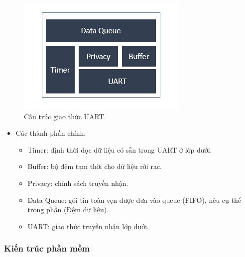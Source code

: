 \documentclass[a4paper,12pt,oneside]{article}
\begin{document}
\begin{itemize}
\begin{itemize}
			\begin{figure}[H]
				\centering
				\includegraphics[scale=1]{hinh/uart_protocol.PNG}
				\caption{Cấu trúc giao thức UART.}
			\end{figure}
			
		  \begin{itemize}
		  \item	Các thành phần chính:
		  	\begin{itemize}
		  		\item	Timer: định thời đọc dữ liệu có sẵn trong UART ở lớp dưới.
				\item	Buffer: bộ đệm tạm thời cho dữ liệu rời rạc.
				\item	Privacy: chính sách truyền nhận.
				\item	Data Queue: gói tin toàn vẹn được đưa vào queue (FIFO), nêu cụ thể trong phần (Đệm dữ liệu). 
				\item	UART: giao thức truyền nhận lớp dưới.
		  	\end{itemize}
		  	
		  	
		  \end{itemize}
		\end{itemize}
	\end{itemize}

\subsubsection{Kiến trúc phần mềm}
\end{document}
